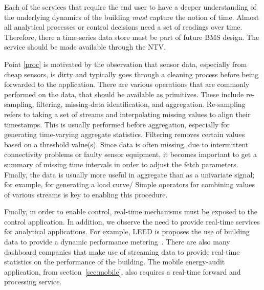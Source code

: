 Each of the services that require the end user to have a deeper understanding of the underlying dynamics 
of the building \emph{must} capture the notion of time.  Almost all analytical processes or control decisions need a set of readings
over time.  Therefore, there a time-series data store must be part of future BMS design.  The service should be made available
through the NTV.  %

Point \ref{proc} is motivated by the observation that sensor data, especially from cheap sensors, is dirty and typically goes
through a cleaning process before being forwarded to the application.  There are various operations that are commonly
performed on the data, that should be available as primitives.  These include re-sampling, filtering,  
missing-data identification, and aggregation.  Re-sampling refers to taking a set of streams and interpolating missing values to 
align their timestamps.  This is usually performed before aggregation, especially for generating time-varying aggregate statistics.
Filtering removes certain values based on a threshold value(s).  
Since data is often missing, due to intermittent connectivity problems or faulty sensor equipment, it becomes important to 
get a summary of missing time intervals in order to adjust the fetch parameters.  Finally, the data is usually more
useful in aggregate than as a univariate signal; for example, for generating a load curve/ %
Simple operators for combining values of various streams is key to enabling this procedure.

Finally, in order to enable control, real-time mechanisms must be exposed to the control application.
In addition, we observe the need to provide real-time services for analytical applications.
For example, LEED is proposes the use of building data to provide a dynamic performance metering~\cite{dynleed}.
There are also many dashboard companies that make use of streaming data to provide real-time statistics on the performance of the
building.  The mobile energy-audit application, from section~\ref{sec:mobile}, also requires a real-time forward and processing service.

